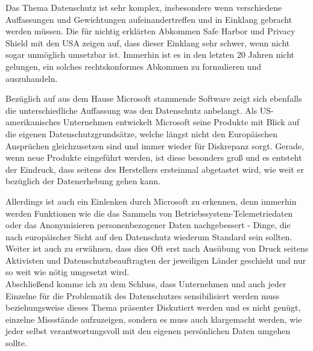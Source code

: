 Das Thema Datenschutz ist sehr komplex, insbesondere wenn verschiedene Auffassungen und Gewichtungen aufeinandertreffen und in Einklang gebracht werden müssen. Die für nichtig erklärten Abkommen \glqq Safe Harbor\grqq{} und \glqq Privacy Shield\grqq{} mit den USA zeigen auf, dass dieser Einklang sehr schwer, wenn nicht sogar unmöglich umsetzbar ist. Immerhin ist es in den letzten 20 Jahren nicht gelungen, ein solches rechtskonformes Abkommen zu formulieren und auszuhandeln.

Bezüglich auf aus dem Hause Microsoft stammende Software zeigt sich ebenfalls die unterschiedliche Auffassung was den Datenschutz anbelangt. Als US-amerikanisches Unternehmen entwickelt Microsoft seine Produkte mit Blick auf die eigenen Datenschutzgrundsätze, welche längst nicht den Europäischen Ansprüchen gleichzusetzen sind und immer wieder für Diskrepanz sorgt. Gerade, wenn neue Produkte eingeführt werden, ist diese besonders groß und es entsteht der Eindruck, dass seitens des Herstellers ersteinmal abgetastet wird, wie weit er bezüglich der Datenerhebung gehen kann.

Allerdings ist auch ein Einlenken durch Microsoft zu erkennen, denn immerhin werden Funktionen wie die das Sammeln von Betriebssystem-Telemetriedaten oder das Anonymisieren personenbezogener Daten nachgebessert - Dinge, die nach europäischer Sicht auf den Datenschutz wiederum Standard sein sollten. Weiter ist auch zu erwähnen, dass dies Oft erst nach Ausübung von Druck seitens Aktivisten und Datenschutzbeauftragten der jeweiligen Länder geschieht und nur so weit wie nötig umgesetzt wird.\\

Abschließend komme ich zu dem Schluss, dass Unternehmen und auch jeder Einzelne für die Problematik des Datenschutzes sensibilisiert werden muss beziehungsweise dieses Thema präsenter Diskutiert werden und es nicht genügt, einzelne Missstände aufzuzeigen, sondern es muss auch klargemacht werden, wie jeder selbst verantwortungsvoll mit den eigenen persönlichen Daten umgehen sollte.
\\